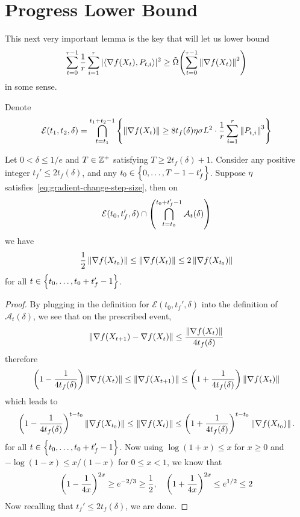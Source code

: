 \section{Progress Lower Bound}

This next very important lemma is the key that will let us lower bound 
\begin{align*}
    \sum_{t=0}^{\tau-1} \frac 1r \sum_{i=1}^r |\langle \nabla f(X_t), P_{t,i} \rangle|^2 \geq \tilde \Omega \qty(\sum_{t=0}^{\tau-1} \left\lVert \nabla f(X_t) \right\rVert^2)
\end{align*}
in some sense.

Denote
\begin{align*}
    \mathcal E(t_1, t_2, \delta) = \bigcap_{t=t_1}^{t_1+t_2-1} \left\{\left\lVert \nabla f(X_t) \right\rVert \geq 8t_f(\delta) \eta \sigma L^2 \cdot \frac 1r \sum_{i=1}^r \left\lVert P_{t,i} \right\rVert^3\right\}
\end{align*}

\begin{lemma}\label{lem:half-two-gradient}
    Let $0 < \delta \leq 1/e$ and $T \in \mathbb{Z}^+$ satisfying $T \geq 2t_f(\delta) + 1$. Consider any positive integer $t_f' \leq 2t_f(\delta)$, and any $t_0 \in \left\{0, \ldots, T-1-t_f'\right\}$. Suppose $\eta$ satisfies~\eqref{eq:gradient-change-step-size}, then on
    \begin{align*}
        \mathcal E(t_0, t_f', \delta) \cap \qty(\bigcap_{t=t_0}^{t_0+t_f'-1} \mathcal A_t(\delta))
    \end{align*}
    we have
    \begin{align*}
        \frac 12 \left\lVert \nabla f(X_{t_0}) \right\rVert \leq \left\lVert \nabla f(X_t) \right\rVert \leq 2 \left\lVert \nabla f(X_{t_0}) \right\rVert
    \end{align*} 
    for all $t \in \left\{t_0, \ldots, t_0+t_f'-1\right\}$. 
\end{lemma}
\begin{proof}
    By plugging in the definition for $\mathcal E(t_0,t_f',\delta)$ into the definition of $\mathcal A_t(\delta)$, we see that on the prescribed event,
    \begin{align*}
        \left\lVert \nabla f(X_{t+1})-\nabla f(X_t) \right\rVert \leq \frac{\left\lVert \nabla f(X_{t}) \right\rVert}{4t_f(\delta)}
    \end{align*}
    therefore
    \begin{align*}
        \qty(1-\frac{1}{4t_f(\delta)})\left\lVert \nabla f(X_t) \right\rVert \leq \left\lVert \nabla f(X_{t+1}) \right\rVert \leq \qty(1+\frac{1}{4t_f(\delta)}) \left\lVert \nabla f(X_t) \right\rVert
    \end{align*}
    which leads to
    \begin{align*}
        \qty(1 - \frac{1}{4t_f(\delta)})^{t-t_0} \left\lVert \nabla f(X_{t_0}) \right\rVert \leq \left\lVert \nabla f(X_t) \right\rVert \leq \qty(1+\frac{1}{4t_f(\delta)})^{t-t_0} \left\lVert \nabla f(X_{t_0}) \right\rVert.
    \end{align*}
    for all $t \in \left\{t_0, \ldots, t_0+t_f'-1\right\}$. Now using $\log(1+x) \leq x$ for $x \geq 0$ and $-\log(1-x) \leq x/(1-x)$ for $0 \leq x < 1$, we know that
    \begin{align*}
        \qty(1 - \frac{1}{4x})^{2x} \geq e^{-2/3} \geq \frac 12, \quad \qty(1+\frac{1}{4x})^{2x} \leq e^{1/2} \leq 2
    \end{align*}
    Now recalling that $t_f' \leq 2t_f(\delta)$, we are done.
\end{proof}

